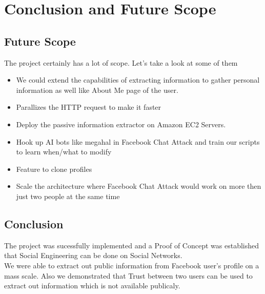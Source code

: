 \chapter{Conclusion and Future Scope}


\section{Future Scope}

The project certainly has a lot of scope. Let's take a look at some of them

\begin{itemize}
\item{We could extend the capabilities of extracting information to gather personal information as well like About Me page of the user.}
\item{Parallizes the HTTP request to make it faster}
\item{Deploy the passive information extractor on Amazon EC2 Servers.}
\item{Hook up AI bots like megahal\cite{wiki_megahal} in Facebook Chat Attack and train our scripts to learn when/what to modify}
\item{Feature to clone profiles}
\item{Scale the architecture where Facebook Chat Attack would work on more then just two people at the same time}
\end{itemize}

\section{Conclusion}
The project was sucessfully implemented and a Proof of Concept was established that Social Engineering can be done on Social Networks.\\
We were able to extract out public information from Facebook user's profile on a mass scale. Also we demonstrated that Trust between two users can be used to extract out information which is not available publicaly.

